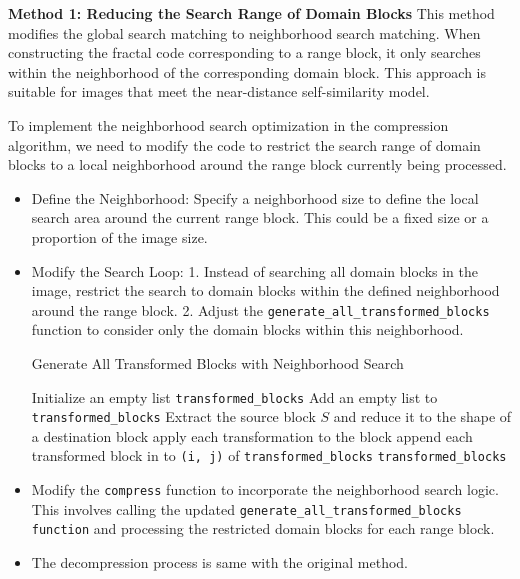 \documentclass[a4paper,11pt, titlepage]{article}
\theoremstyle{definition}
\theoremstyle{plain}
\theoremstyle{remark}
\theoremstyle{definition}
\begin{document}
\textbf{Method 1: Reducing the Search Range of Domain Blocks}
This method modifies the global search matching to neighborhood search matching. When constructing the fractal code corresponding to a range block, it only searches within the neighborhood of the corresponding domain block. This approach is suitable for images that meet the near-distance self-similarity model.

To implement the neighborhood search optimization in the compression algorithm, we need to modify the code to restrict the search range of domain blocks to a local neighborhood around the range block currently being processed.

\begin{itemize}
    \item Define the Neighborhood: Specify a neighborhood size to define the local search area around the current range block. This could be a fixed size or a proportion of the image size.
    \item Modify the Search Loop: 1. Instead of searching all domain blocks in the image, restrict the search to domain blocks within the defined neighborhood around the range block. 2. Adjust the \texttt{generate\_all\_transformed\_blocks} function to consider only the domain blocks within this neighborhood.

\begin{algorithm}
\caption{Generate All Transformed Blocks with Neighborhood Search}
\begin{algorithmic}[1]
\STATE Initialize an empty list \texttt{transformed\_blocks}
    \STATE Add an empty list to \texttt{transformed\_blocks}
        \STATE Extract the source block $S$ and reduce it to the shape of a destination block
        \STATE apply each transformation to the block
        \STATE append each transformed block in to \texttt{(i, j)} of   \texttt{transformed\_blocks}
    \ENDFOR
\ENDFOR
\RETURN \texttt{transformed\_blocks}
\end{algorithmic}
\end{algorithm}

    \item Modify the \texttt{compress} function to incorporate the neighborhood search logic. This involves calling the updated \texttt{generate\_all\_transformed\_blocks function} and processing the restricted domain blocks for each range block.
    \item The decompression process is same with the original method.
\end{itemize}
\end{document}
